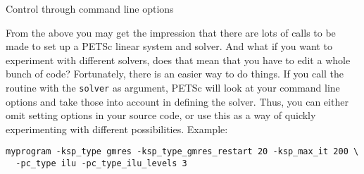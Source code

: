  {Control through command line options}

From the above you may get the impression that there are lots of calls
to be made to set up a PETSc linear system and solver. And what if you
want to experiment with different solvers, does that mean that you
have to edit a whole bunch of code? Fortunately, there is an easier
way to do things. If you call the routine
%
with the \lstinline{solver} as argument,
%
PETSc will look at your command line options and take those into
account in defining the solver. Thus, you can either omit setting
options in your source code, or use this as a way of quickly
experimenting with different possibilities. Example:

\begin{verbatim}
myprogram -ksp_type gmres -ksp_type_gmres_restart 20 -ksp_max_it 200 \
  -pc_type ilu -pc_type_ilu_levels 3
\end{verbatim}


